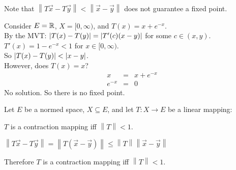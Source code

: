 \documentclass[letterpaper,12pt,fleqn]{article}
\newcommand{\vx}{\vec{x}}
\newcommand{\vy}{\vec{y}}
\newcommand{\norm}[1]{\left\|#1\right\|}
\begin{document}
Note that $\norm{T\vx-T\vy}<\norm{\vx-\vy}$ does not guarantee a fixed point.

Consider $E=\mathbb{R}$, $X=[0,\infty)$, and $T(x)=x+e^{-x}$. \\
By the MVT: $\lvert T(x)-T(y)\rvert=\lvert T'(c)(x-y)\rvert$ for some $c\in(x,y)$. \\
$T'(x)=1-e^{-x}<1$ for $x\in[0,\infty)$. \\
So $\lvert T(x)-T(y)\rvert<\lvert x-y\rvert$. \\
However, does $T(x)=x$?
\begin{eqnarray*}
  x &=& x+e^{-x} \\
  e^{-x} &=& 0
\end{eqnarray*}
No solution. So there is no fixed point.

\begin{theorem}
  Let $E$ be a normed space, $X\subseteq E$, and let $T:X\to E$ be a linear
  mapping:

  \qquad$T$ is a contraction mapping iff $\norm{T}<1$.
\end{theorem}

\begin{theproof}
  $\norm{T\vx-T\vy}=\norm{T(\vx-\vy)}\le\norm{T}\norm{\vx-\vy}$

  Therefore $T$ is a contraction mapping iff $\norm{T}<1$.
\end{theproof}
\end{document}
